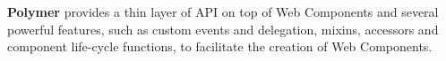 \textbf{Polymer} provides a thin layer of API on top of Web Components and several powerful features, such as custom events and delegation, mixins, accessors and component life-cycle functions, to facilitate the creation of Web Components. 


 


